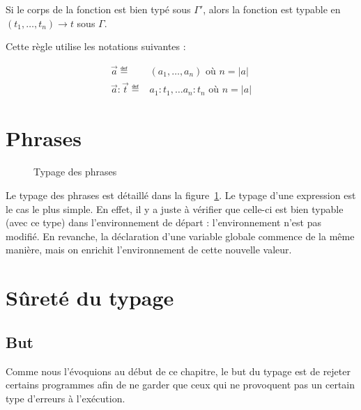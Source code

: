 Si le corps de la fonction est bien typé sous $Γ'$, alors la fonction est
typable en $(t_1, …, t_n) → t$ sous $Γ$.

\begin{mathpar}
\end{mathpar}

Cette règle utilise les notations suivantes :

\begin{align*}
\vec{a}
\eqdef &
(a_1, …, a_n) \textrm{ où } n = |a|
\\
\vec{a} : \vec{t}
\eqdef &
a_1: t_1,…
a_n: t_n \textrm{ où } n = |a|
\end{align*}


\section{Phrases}

\begin{figure}


  \begin{mathpar}

  \end{mathpar}

  \caption{Typage des phrases}
  \label{fig:typ-ph}

\end{figure}

Le typage des phrases est détaillé dans la figure~\ref{fig:typ-ph}. Le typage
d'une expression est le cas le plus simple. En effet, il y a juste à vérifier
que celle-ci est bien typable (avec ce type) dans l'environnement de départ :
l'environnement n'est pas modifié. En revanche, la déclaration d'une variable
globale commence de la même manière, mais on enrichit l'environnement de cette
nouvelle valeur.

\section{Sûreté du typage}

\subsection{But}

Comme nous l'évoquions au début de ce chapitre, le but du typage est de rejeter
certains programmes afin de ne garder que ceux qui ne provoquent pas un certain
type d'erreurs à l'exécution.

